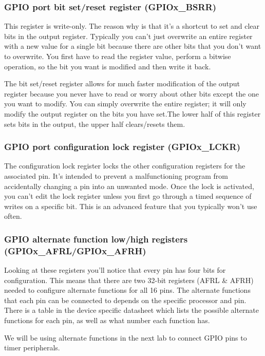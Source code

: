 \documentclass[11pt,fleqn]{book} %
\begin{document}
\subsubsection{GPIO port bit set/reset register (GPIOx\_BSRR)}
This register is write-only. The reason why is that it's a shortcut to set and clear bits in the output register. Typically you can't just overwrite an entire register with a new value for a single bit because there are other bits that you don't want to overwrite. You first have to read the register value, perform a bitwise operation, so the bit you want is modified and then write it back.

The bit set/reset register allows for much faster modification of the output register because you never have to read or worry about other bits except the one you want to modify. You can simply overwrite the entire register; it will only modify the output register on the bits you have set.The lower half of this register sets bits in the output, the upper half clears/resets them.

\subsubsection{GPIO port configuration lock register (GPIOx\_LCKR)}
The configuration lock register locks the other configuration registers for the associated pin. It's intended to prevent a malfunctioning program from accidentally changing a pin into an unwanted mode. Once the lock is activated, you can't edit the lock register unless you first go through a timed sequence of writes on a specific bit. This is an advanced feature that you typically won't use often.

\subsubsection{GPIO alternate function low/high registers (GPIOx\_AFRL/GPIOx\_AFRH)}
Looking at these registers you'll notice that every pin has four bits for configuration. This means that there are two 32-bit registers (AFRL \& AFRH) needed to configure alternate functions for all 16 pins. The alternate functions that each pin can be connected to depends on the specific processor and pin. There is a table in the device specific datasheet which lists the possible alternate functions for each pin, as well as what number each function has.

We will be using alternate functions in the next lab to connect GPIO pins to timer peripherals.
\end{document}
